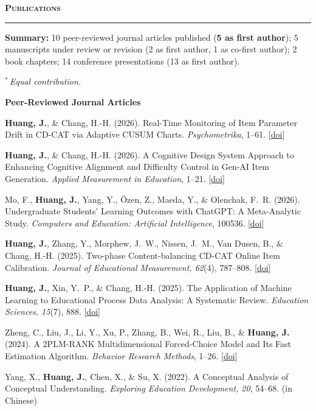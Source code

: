 \documentclass[10.5pt,letterpaper]{article}
\renewcommand{\section}[1]{%
  \needspace{3\baselineskip}\vspace{12pt}\par
  {\fontsize{13.5}{16}\selectfont\bfseries\scshape\color{accent}#1}\hspace{6pt}%
  {\color{accent}\leaders\hrule height 0.8pt\hfill\kern0pt}\par\vspace{6pt}}
\newcommand{\me}[1]{\textbf{#1}}   %
\newcommand{\doi}[1]{[\href{https://doi.org/#1}{\textcolor{linkblue}{doi}}]}   %
\begin{document}
\section{Publications}
\textbf{Summary:} 10 peer-reviewed journal articles published (\textbf{5 as first author}); 5 manuscripts under review or revision (2 as first author, 1 as co-first author); 2 book chapters; 14 conference presentations (13 as first author).\par\vspace{4pt}
{\itshape $^{*}$\,Equal contribution.}\par\vspace{4pt}
{\color{textdark}\textbf{Peer-Reviewed Journal Articles}}\par\vspace{2pt}
\begin{pubs}
\item \me{Huang, J.}, \& Chang, H.-H. (2026). Real-Time Monitoring of Item Parameter Drift in CD-CAT via Adaptive CUSUM Charts. \textit{Psychometrika}, 1--61. \doi{10.1017/psy.2026.10140}
\item \me{Huang, J.}, \& Chang, H.-H. (2026). A Cognitive Design System Approach to Enhancing Cognitive Alignment and Difficulty Control in Gen-AI Item Generation. \textit{Applied Measurement in Education}, 1--21. \doi{10.1080/08957347.2026.2740622}
\item Mo, F., \me{Huang, J.}, Yang, Y., \"{O}zen, Z., Maeda, Y., \& Olenchak, F.~R. (2026). Undergraduate Students' Learning Outcomes with ChatGPT: A Meta-Analytic Study. \textit{Computers and Education: Artificial Intelligence}, 100536. \doi{10.1016/j.caeai.2025.100536}
\item \me{Huang, J.}, Zhang, Y., Morphew, J.~W., Nissen, J.~M., Van Dusen, B., \& Chang, H.-H. (2025). Two-phase Content-balancing CD-CAT Online Item Calibration. \textit{Journal of Educational Measurement, 62}(4), 787--808. \doi{10.1111/jedm.70012}
\item \me{Huang, J.}, Xin, Y.~P., \& Chang, H.-H. (2025). The Application of Machine Learning to Educational Process Data Analysis: A Systematic Review. \textit{Education Sciences, 15}(7), 888. \doi{10.3390/educsci15070888}
\item Zheng, C., Liu, J., Li, Y., Xu, P., Zhang, B., Wei, R., Liu, B., \& \me{Huang, J.} (2024). A 2PLM-RANK Multidimensional Forced-Choice Model and Its Fast Estimation Algorithm. \textit{Behavior Research Methods}, 1--26. \doi{10.3758/s13428-023-02315-x}
\item Yang, X., \me{Huang, J.}, Chen, X., \& Su, X. (2022). A Conceptual Analysis of Conceptual Understanding. \textit{Exploring Education Development, 20}, 54--68. (in Chinese)

\end{pubs}
\end{document}
